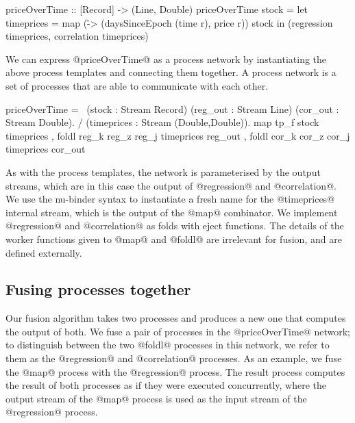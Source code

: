 \begin{haskell}
priceOverTime :: [Record] -> (Line, Double)
priceOverTime stock =
  let timeprices = map (\r -> (daysSinceEpoch (time r), price r)) stock
  in (regression timeprices, correlation timeprices)
\end{haskell}

We can express @priceOverTime@ as a process network by instantiating the above process templates and connecting them together.
A process network is a set of processes that are able to communicate with each other.

\begin{process}
priceOverTime =
  \ (stock : Stream Record)
    (reg_out : Stream Line) (cor_out : Stream Double).
  / (timeprices : Stream (Double,Double)).
     { map    tp_f             stock      timeprices
     , foldl reg_k reg_z reg_j timeprices reg_out
     , foldl cor_k cor_z cor_j timeprices cor_out }
\end{process}

As with the process templates, the network is parameterised by the output streams, which are in this case the output of @regression@ and @correlation@.
We use the nu-binder syntax to instantiate a fresh name for the @timeprices@ internal stream, which is the output of the @map@ combinator.
We implement @regression@ and @correlation@ as folds with eject functions.
The details of the worker functions given to @map@ and @foldl@ are irrelevant for fusion, and are defined externally.

\subsection{Fusing processes together}
\label{s:FusingProcesses}

Our fusion algorithm takes two processes and produces a new one that computes the output of both.
We fuse a pair of processes in the @priceOverTime@ network; to distinguish between the two @foldl@ processes in this network, we refer to them as the @regression@ and @correlation@ processes.
As an example, we fuse the @map@ process with the @regression@ process.
The result process computes the result of both processes as if they were executed concurrently, where the output stream of the @map@ process is used as the input stream of the @regression@ process.

